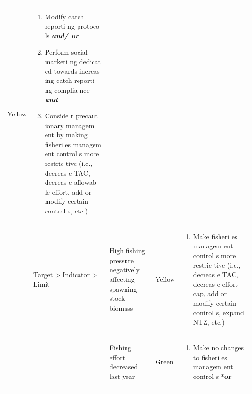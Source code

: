 \documentclass[]{book}
\providecommand{\tightlist}{%
  \setlength{\itemsep}{0pt}\setlength{\parskip}{0pt}}
\begin{document}
\begin{longtable}[]{@{}lllll@{}}
\begin{minipage}[t]{0.19\columnwidth}
Yellow\strut
\end{minipage} & \begin{minipage}[t]{0.19\columnwidth}\raggedright\strut
\begin{enumerate}
\def\labelenumi{\arabic{enumi}.}
\item
  Modify catch reporti ng protoco ls \textbf{\emph{and/ or}}
\item
  Perform social marketi ng dedicat ed towards increas ing catch reporti
  ng complia nce \textbf{\emph{and} }
\item
  Conside r precaut ionary managem ent by making fisheri es managem ent
  control s more restric tive (i.e., decreas e TAC, decreas e allowab le
  effort, add or modify certain control s, etc.)
\end{enumerate}\strut
\end{minipage}\tabularnewline
\begin{minipage}[t]{0.19\columnwidth}\raggedright\strut
\strut
\end{minipage} & \begin{minipage}[t]{0.19\columnwidth}\raggedright\strut
Target \textgreater{} Indicator \textgreater{} Limit\strut
\end{minipage} & \begin{minipage}[t]{0.19\columnwidth}\raggedright\strut
High fishing pressure negatively affecting spawning stock biomass\strut
\end{minipage} & \begin{minipage}[t]{0.19\columnwidth}\raggedright\strut
Yellow\strut
\end{minipage} & \begin{minipage}[t]{0.19\columnwidth}\raggedright\strut
\begin{enumerate}
\def\labelenumi{\arabic{enumi}.}
\tightlist
\item
  Make fisheri es managem ent control s more restric tive (i.e., decreas
  e TAC, decreas e effort cap, add or modify certain control s, expand
  NTZ, etc.)
\end{enumerate}\strut
\end{minipage}\tabularnewline
\begin{minipage}[t]{0.19\columnwidth}\raggedright\strut
\strut
\end{minipage} & \begin{minipage}[t]{0.19\columnwidth}\raggedright\strut
\strut
\end{minipage} & \begin{minipage}[t]{0.19\columnwidth}\raggedright\strut
Fishing effort decreased last year\strut
\end{minipage} & \begin{minipage}[t]{0.19\columnwidth}\raggedright\strut
Green\strut
\end{minipage} & \begin{minipage}[t]{0.19\columnwidth}\raggedright\strut
\begin{enumerate}
\def\labelenumi{\arabic{enumi}.}
\tightlist
\item
  Make no changes to fisheri es managem ent control s *\textbf{or}
\end{enumerate}


\end{minipage}
\end{longtable}
\end{document}
